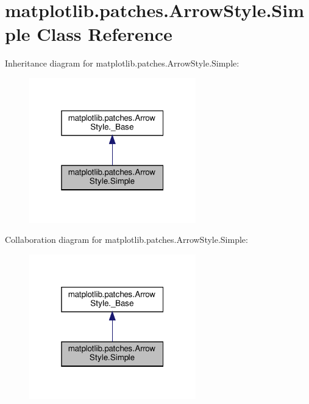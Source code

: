 \hypertarget{classmatplotlib_1_1patches_1_1ArrowStyle_1_1Simple}{}\section{matplotlib.\+patches.\+Arrow\+Style.\+Simple Class Reference}
\label{classmatplotlib_1_1patches_1_1ArrowStyle_1_1Simple}


Inheritance diagram for matplotlib.\+patches.\+Arrow\+Style.\+Simple\+:
\nopagebreak
\begin{figure}[H]
\begin{center}
\leavevmode
\includegraphics[width=205pt]{classmatplotlib_1_1patches_1_1ArrowStyle_1_1Simple__inherit__graph}
\end{center}
\end{figure}


Collaboration diagram for matplotlib.\+patches.\+Arrow\+Style.\+Simple\+:
\nopagebreak
\begin{figure}[H]
\begin{center}
\leavevmode
\includegraphics[width=205pt]{classmatplotlib_1_1patches_1_1ArrowStyle_1_1Simple__coll__graph}
\end{center}
\end{figure}
